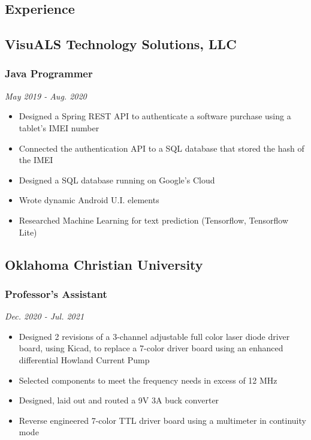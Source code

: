 \documentclass{article}
\begin{document}
\begin{spacing}{.5}
\section{Experience}
	\subsection{VisuALS Technology Solutions, LLC}
		\subsubsection{\large{Java Programmer}} \hfill \small{\textsl{May 2019 - Aug. 2020}}
			\begin{itemize}[label=--,itemsep=-.35ex]
				\item \large{Designed a Spring REST API to authenticate a software purchase using a tablet's IMEI number}
				\item \large{Connected the authentication API to a SQL database that stored the hash of the IMEI}
				\item \large{Designed a SQL database running on Google's Cloud}
				\item \large{Wrote dynamic Android U.I. elements}
				\item \large{Researched Machine Learning for text prediction} \small{(Tensorflow, Tensorflow Lite)}
			\end{itemize}


	\subsection{Oklahoma Christian University}
		\subsubsection{\large{Professor's Assistant}} \hfill \small{\textsl{Dec. 2020 - Jul. 2021}}
			\begin{itemize}[label=--,itemsep=-.35ex]
				\item \large{Designed 2 revisions of a 3-channel adjustable full color laser diode driver board, using Kicad, to replace a 7-color driver board using an enhanced differential Howland Current Pump}
				\item \large{Selected components to meet the frequency needs in excess of 12 MHz}
				\item \large{Designed, laid out and routed a 9V 3A buck converter}
				\item \large{Reverse engineered 7-color TTL driver board using a multimeter in continuity mode}
			\end{itemize}

\end{spacing}
\end{document}
